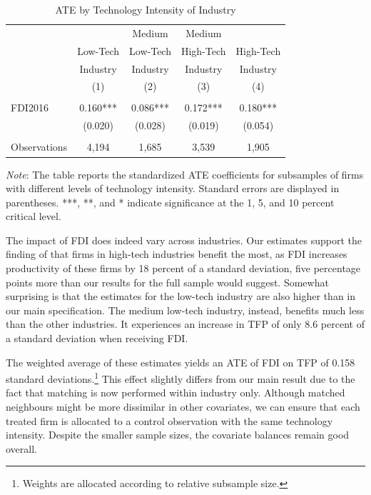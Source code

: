 \documentclass[a4paper,11pt]{scrartcl}
\begin{document}
\begin{table}[h!]
  \centering
   \caption{ATE by Technology Intensity of Industry}
   \label{tab:TECH}
\begin{threeparttable}
 
\begin{tabular}{lcccc}
 \hline
 \hline
 & & Medium & Medium &  \\ 
 & Low-Tech & Low-Tech & High-Tech & High-Tech \\ 
 & Industry & Industry & Industry & Industry \\ 
 & (1) & (2) & (3) & (4) \\
 \hline
 &  &  &  &  \\
FDI2016 & 0.160*** & 0.086*** & 0.172*** & 0.180*** \\
	      & (0.020) & (0.028) & (0.019) & (0.054) \\
	      &  &  &  &  \\
 Observations & 4,194 & 1,685 & 3,539 & 1,905 \\ 
	\hline
	\hline
\end{tabular}	

\begin{tablenotes}[flushleft]
     \footnotesize       
\item \textit{Note}: The table reports the standardized ATE coefficients for subsamples of firms with different levels of technology intensity. Standard errors are displayed in parentheses. ***, **, and * indicate significance at the 1, 5, and 10 percent critical level. 

\end{tablenotes}


\end{threeparttable}
\end{table}

The impact of FDI does indeed vary across industries. Our estimates support the finding of \citet{Keller2009} that firms in high-tech industries benefit the most, as FDI increases productivity of these firms by 18 percent of a standard deviation, five percentage points more than our results for the full sample would suggest. Somewhat surprising is that the estimates for the low-tech industry are also higher than in our main specification. The medium low-tech industry, instead, benefits much less than the other industries. It experiences an increase in TFP of only 8.6 percent of a standard deviation when receiving FDI. 

The weighted average of these estimates yields an ATE of FDI on TFP of 0.158 standard deviations.\footnote{Weights are allocated according to relative subsample size.} This effect slightly differs from our main result due to the fact that matching is now performed within industry only. Although matched neighbours might be more dissimilar in other covariates, we can ensure that each treated firm is allocated to a control observation with the same technology intensity. Despite the smaller sample sizes, the covariate balances remain good overall. \\
\end{document}
